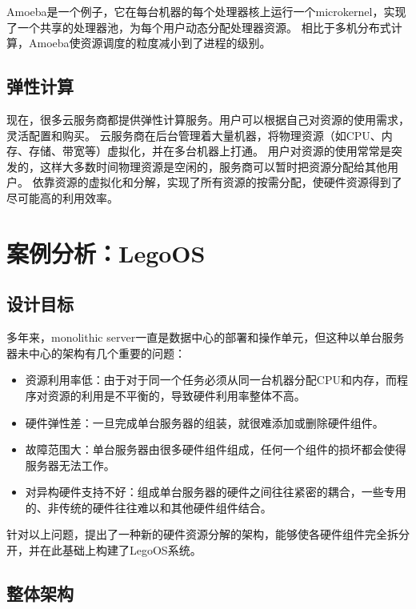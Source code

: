 Amoeba\cite{tanenbaum1991amoeba}是一个例子，它在每台机器的每个处理器核上运行一个microkernel，实现了一个共享的处理器池，为每个用户动态分配处理器资源。
相比于多机分布式计算，Amoeba使资源调度的粒度减小到了进程的级别。

\subsection{弹性计算}

现在，很多云服务商都提供弹性计算服务。用户可以根据自己对资源的使用需求，灵活配置和购买。
云服务商在后台管理着大量机器，将物理资源（如CPU、内存、存储、带宽等）虚拟化，并在多台机器上打通。
用户对资源的使用常常是突发的，这样大多数时间物理资源是空闲的，服务商可以暂时把资源分配给其他用户。
依靠资源的虚拟化和分解，实现了所有资源的按需分配，使硬件资源得到了尽可能高的利用效率。


\section{案例分析：LegoOS}

\subsection{设计目标}

多年来，monolithic server一直是数据中心的部署和操作单元，但这种以单台服务器未中心的架构有几个重要的问题：
\begin{itemize}
\item 资源利用率低：由于对于同一个任务必须从同一台机器分配CPU和内存，而程序对资源的利用是不平衡的，导致硬件利用率整体不高。
\item 硬件弹性差：一旦完成单台服务器的组装，就很难添加或删除硬件组件。
\item 故障范围大：单台服务器由很多硬件组件组成，任何一个组件的损坏都会使得服务器无法工作。
\item 对异构硬件支持不好：组成单台服务器的硬件之间往往紧密的耦合，一些专用的、非传统的硬件往往难以和其他硬件组件结合。
\end{itemize}

针对以上问题，提出了一种新的硬件资源分解的架构，能够使各硬件组件完全拆分开，并在此基础上构建了LegoOS系统。

\subsection{整体架构}

